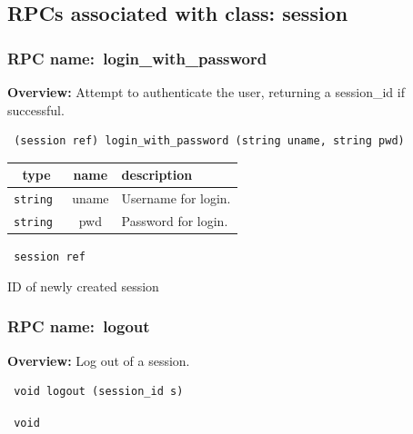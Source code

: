 \subsection{RPCs associated with class: session}
\subsubsection{RPC name:~login\_with\_password}

{\bf Overview:} 
Attempt to authenticate the user, returning a session\_id if successful.

\begin{verbatim} (session ref) login_with_password (string uname, string pwd)\end{verbatim}



 
\vspace{0.3cm}
\begin{tabular}{|c|c|p{7cm}|}
 \hline
{\bf type} & {\bf name} & {\bf description} \\ \hline
{\tt string } & uname & Username for login. \\ \hline 

{\tt string } & pwd & Password for login. \\ \hline 

\end{tabular}

\vspace{0.3cm}

{\tt 
session ref
}


ID of newly created session
\vspace{0.3cm}
\vspace{0.3cm}
\vspace{0.3cm}
\subsubsection{RPC name:~logout}

{\bf Overview:} 
Log out of a session.

\begin{verbatim} void logout (session_id s)\end{verbatim}


\vspace{0.3cm}

{\tt 
void
}



